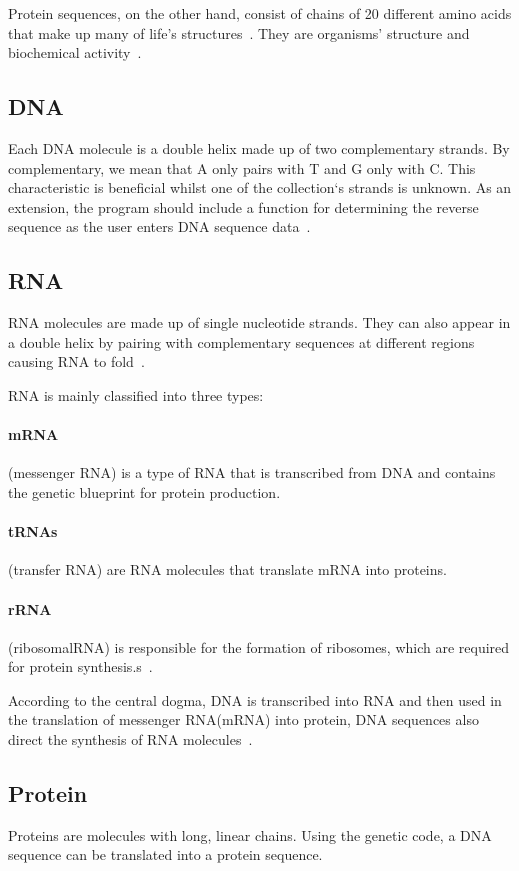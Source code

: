 \documentclass[]{final_report}
\begin{document}
Protein sequences, on the other hand, consist of chains of 20 different amino acids that make up many of life's structures~\cite{waterman2018introduction}. They are organisms' structure and biochemical activity~\cite{lesk2019introduction}.

\subsection{DNA}
Each DNA molecule is a double helix made up of two complementary strands. By complementary, we mean that A only pairs with T and G only with C. This characteristic is beneficial whilst one of the collection`s strands is unknown. As an extension, the program should include a function for determining the reverse sequence as the user enters DNA sequence data~\cite{claverie2006bioinformatics}.

\subsection{RNA}
RNA molecules are made up of single nucleotide strands. They can also appear in a double helix by pairing with complementary sequences at different regions causing RNA to fold~\cite{claverie2006bioinformatics}.

RNA is mainly classified into three types:

\paragraph{mRNA} (messenger RNA) is a type of RNA that is transcribed from DNA and contains the genetic blueprint for protein production.
\paragraph{tRNAs} (transfer RNA) are RNA molecules that translate mRNA into proteins.
\paragraph{rRNA} (ribosomalRNA) is responsible for the formation of ribosomes, which are required for protein synthesis.s~\cite{wang2020biochemistry}.

According to the central dogma, DNA is transcribed into RNA and then used in the translation of messenger RNA(mRNA) into protein, DNA sequences also direct the synthesis of RNA molecules~\cite{lesk2019introduction}.

\subsection{Protein}
Proteins are molecules with long, linear chains. Using the genetic code, a DNA sequence can be translated into a protein sequence.
\end{document}
